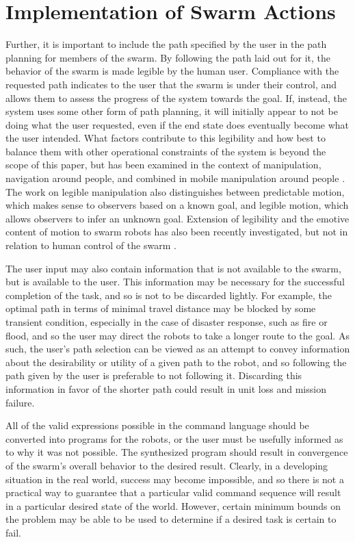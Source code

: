 \chapter{Implementation of Swarm Actions} \label{chapter:Implementation_of_Swarm_Actions}

Further, it is important to include the path specified by the user in the path planning for members of the swarm. 
By following the path laid out for it, the behavior of the swarm is made legible by the human user. 
Compliance with the requested path indicates to the user that the swarm is under their control, and allows them to assess the progress of the system towards the goal. 
If, instead, the system uses some other form of path planning, it will initially appear to not be doing what the user requested, even if the end state does eventually become what the user intended. 
What factors contribute to this legibility and how best to balance them with other operational constraints of the system is beyond the scope of this paper, but has been examined in the context of manipulation, navigation around people, and combined in mobile manipulation around people \citep{beetz2010generality, kruse2013human, dragan2015effects}.
The work on legible manipulation also distinguishes between predictable motion, which makes sense to observers based on a known goal, and legible motion, which allows observers to infer an unknown goal. 
Extension of legibility and the emotive content of motion to swarm robots has also been recently investigated, but not in relation to human control of the swarm \citep{Dietz:2017:HPS:3027063.3053220}.

The user input may also contain information that is not available to the swarm, but is available to the user. 
This information may be necessary for the successful completion of the task, and so is not to be discarded lightly. 
For example, the optimal path in terms of minimal travel distance may be blocked by some transient condition, especially in the case of disaster response, such as fire or flood, and so the user may direct the robots to take a longer route to the goal.
As such, the user's path selection can be viewed as an attempt to convey information about the desirability or utility of a given path to the robot, and so following the path given by the user is preferable to not following it.  
Discarding this information in favor of the shorter path could result in unit loss and mission failure.
 
All of the valid expressions possible in the command language should be converted into programs for the robots, or the user must be usefully informed as to why it was not possible. 
The synthesized program should result in convergence of the swarm's overall behavior to the desired result. 
Clearly, in a developing situation in the real world, success may become impossible, and so there is not a practical way to guarantee that a particular valid command sequence will result in a particular desired state of the world. 
However, certain minimum bounds on the problem may be able to be used to determine if a desired task is certain to fail. 

